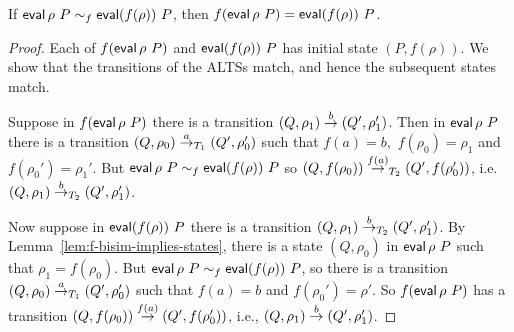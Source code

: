 
\begin{lemma}
\label{lem:ALTS-respects-f-implication}
If $\mathop{\sf eval} \rho~P \sim_f \mathop{\sf eval} (f(\rho))~P$, then $f(\mathop{\sf eval} \rho~P) = \mathop{\sf eval}
(f(\rho))~P$.
\end{lemma}

\begin{proof}
Each of $f(\mathop{\sf eval} \rho~P)$ and $\mathop{\sf eval} (f(\rho))~P$ has initial state
$(P,f(\rho))$.  We show that the transitions of the ALTSs match, and hence the
subsequent states match.

Suppose in  $f(\mathop{\sf eval} \rho~P)$ there is a transition $(Q,\rho_1)
\stackrel{b}{\rightarrow} (Q',\rho_1')$.  Then in $\mathop{\sf eval} \rho~P$ there is a transition
$(Q,\rho_0) \stackrel{a}{\rightarrow}_{T_1} (Q',\rho_0')$ such that $f(a) = b$,\, $f(\rho_0) =
\rho_1$ and $f(\rho_0') = \rho_1'$.  But $\mathop{\sf eval} \rho~P \sim_f \mathop{\sf eval}
(f(\rho))~P$
so $(Q, f(\rho_0)) \stackrel{f(a)}{\rightarrow}_{T_2} (Q',f(\rho_0'))$, i.e.~$(Q,\rho_1)
\stackrel{b}{\rightarrow}_{T_2} (Q',\rho_1')$.

Now suppose in $\mathop{\sf eval} (f(\rho))~P$ there is a transition $(Q,\rho_1)
\stackrel{b}{\rightarrow}_{T_2} (Q',\rho_1')$.  By Lemma~\ref{lem:f-bisim-implies-states},
there is a  state $(Q,\rho_0)$ in $\mathop{\sf eval} \rho~P$ such that $\rho_1 =
f(\rho_0)$.  But $\mathop{\sf eval} \rho~P \sim_f \mathop{\sf eval} (f(\rho))~P$,
so there is a transition $(Q,\rho_0) \stackrel{a}{\rightarrow}_{T_1} (Q',\rho_0')$ such that
$f(a) = b$ and $f(\rho_0') = \rho'$.  So $f(\mathop{\sf eval} \rho~P)$ has a transition
$(Q,f(\rho_0)) \stackrel{f(a)}{\rightarrow} (Q',f(\rho_0'))$, i.e., $(Q,\rho_1) \stackrel{b}{\rightarrow}
(Q',\rho_1')$.
\end{proof}


